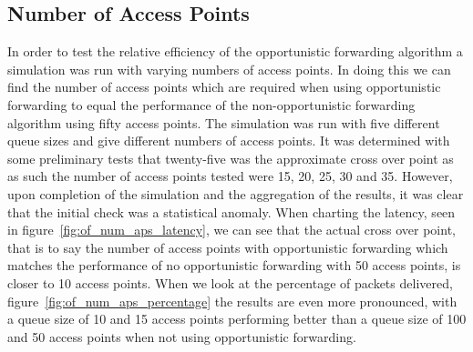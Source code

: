     \subsection{Number of Access Points}\label{data_gathering_performance_number_of_access_points}

        In order to test the relative efficiency of the opportunistic forwarding algorithm a simulation was run with varying numbers of access points. In doing this we can find the number of access points which are required when using opportunistic forwarding to equal the performance of the non-opportunistic forwarding algorithm using fifty access points. The simulation was run with five different queue sizes and give different numbers of access points. It was determined with some preliminary tests that twenty-five was the approximate cross over point as as such the number of access points tested were 15, 20, 25, 30 and 35. However, upon completion of the simulation and the aggregation of the results, it was clear that the initial check was a statistical anomaly. When charting the latency, seen in figure~\ref{fig:of_num_aps_latency}, we can see that the actual cross over point, that is to say the number of access points with opportunistic forwarding which matches the performance of no opportunistic forwarding with 50 access points, is closer to 10 access points. When we look at the percentage of packets delivered, figure~\ref{fig:of_num_aps_percentage} the results are even more pronounced, with a queue size of 10 and 15 access points performing better than a queue size of 100 and 50 access points when not using opportunistic forwarding.

